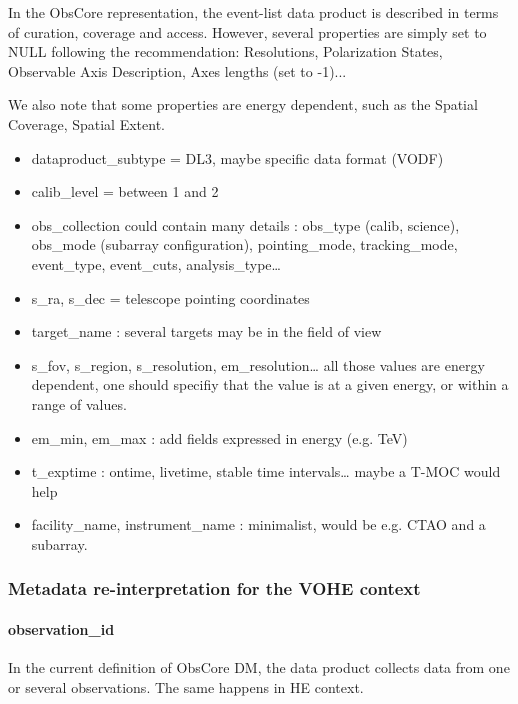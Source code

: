 \documentclass[11pt,a4paper]{ivoa}
\begin{document}
In the ObsCore representation, the event-list data product is described in terms of curation, coverage and access. However, several properties are simply set to NULL following the recommendation: Resolutions, Polarization States, Observable Axis Description, Axes lengths (set to -1)...

We also note that some properties are energy dependent, such as the Spatial Coverage, Spatial Extent.


\begin{itemize}
    \item dataproduct\_subtype = DL3, maybe specific data format (VODF)
    \item calib\_level = between 1 and 2
    \item obs\_collection could contain many details : obs\_type (calib, science), obs\_mode (subarray
configuration), pointing\_mode, tracking\_mode, event\_type, event\_cuts, analysis\_type…
    \item s\_ra, s\_dec = telescope pointing coordinates
    \item target\_name : several targets may be in the field of view
    \item s\_fov, s\_region, s\_resolution, em\_resolution… all those values are energy dependent, one should specifiy that the value is at a given energy, or within a range of values.
    \item em\_min, em\_max : add fields expressed in energy (e.g. TeV)
    \item t\_exptime : ontime, livetime, stable time intervals… maybe a T-MOC would help
    \item facility\_name, instrument\_name : minimalist, would be e.g. CTAO and a subarray.
\end{itemize}



\subsubsection{Metadata re-interpretation for the VOHE context}

\paragraph{observation\_id}
In the current definition of ObsCore DM, the data product collects data from one or several observations.
The same happens in HE context.
\end{document}
